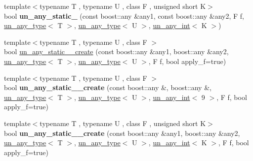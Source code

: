 \begin{DoxyCompactItemize}
\item 
\mbox{\label{group__boost__any__stuff_ga25af56133ac57b6128ef33c8f0e8b87b}} 
{\footnotesize template$<$typename T , typename U , class F , unsigned short K$>$ }\\bool {\bfseries un\+\_\+any\+\_\+static\+\_} (const boost\+::any \&any1, const boost\+::any \&any2, F f, \mbox{\hyperlink{struct_s_m_spp__di__unipi__it_1_1un__any__type}{un\+\_\+any\+\_\+type}}$<$ T $>$, \mbox{\hyperlink{struct_s_m_spp__di__unipi__it_1_1un__any__type}{un\+\_\+any\+\_\+type}}$<$ U $>$, \mbox{\hyperlink{struct_s_m_spp__di__unipi__it_1_1un__any__int}{un\+\_\+any\+\_\+int}}$<$ K $>$)
\item 
{\footnotesize template$<$typename T , typename U , class F $>$ }\\bool \mbox{\hyperlink{group__boost__any__stuff_gaaf87cecb7f9c36476431ceb5bf943b45}{un\+\_\+any\+\_\+static\+\_\+\_\+create}} (const boost\+::any \&any1, boost\+::any \&any2, \mbox{\hyperlink{struct_s_m_spp__di__unipi__it_1_1un__any__type}{un\+\_\+any\+\_\+type}}$<$ T $>$, \mbox{\hyperlink{struct_s_m_spp__di__unipi__it_1_1un__any__type}{un\+\_\+any\+\_\+type}}$<$ U $>$, F f, bool apply\+\_\+f=true)
\item 
\mbox{\label{group__boost__any__stuff_gad05c93ac8f3a8ad6ec7ac17a7568322f}} 
{\footnotesize template$<$typename T , typename U , class F $>$ }\\bool {\bfseries un\+\_\+any\+\_\+static\+\_\+\_\+create} (const boost\+::any \&, boost\+::any \&, \mbox{\hyperlink{struct_s_m_spp__di__unipi__it_1_1un__any__type}{un\+\_\+any\+\_\+type}}$<$ T $>$, \mbox{\hyperlink{struct_s_m_spp__di__unipi__it_1_1un__any__type}{un\+\_\+any\+\_\+type}}$<$ U $>$, \mbox{\hyperlink{struct_s_m_spp__di__unipi__it_1_1un__any__int}{un\+\_\+any\+\_\+int}}$<$ 9 $>$, F f, bool apply\+\_\+f=true)
\item 
\mbox{\label{group__boost__any__stuff_ga2dd7e55c3205482113683097dd2a9b0e}} 
{\footnotesize template$<$typename T , typename U , class F , unsigned short K$>$ }\\bool {\bfseries un\+\_\+any\+\_\+static\+\_\+\_\+create} (const boost\+::any \&any1, boost\+::any \&any2, \mbox{\hyperlink{struct_s_m_spp__di__unipi__it_1_1un__any__type}{un\+\_\+any\+\_\+type}}$<$ T $>$, \mbox{\hyperlink{struct_s_m_spp__di__unipi__it_1_1un__any__type}{un\+\_\+any\+\_\+type}}$<$ U $>$, \mbox{\hyperlink{struct_s_m_spp__di__unipi__it_1_1un__any__int}{un\+\_\+any\+\_\+int}}$<$ K $>$, F f, bool apply\+\_\+f=true)

\end{DoxyCompactItemize}

